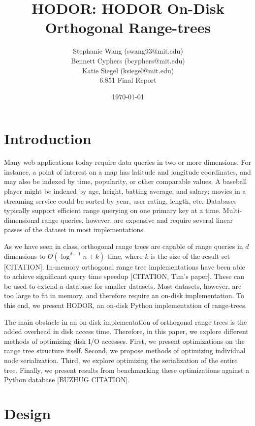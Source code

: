 \documentclass[11pt, oneside]{article}
\title{HODOR: HODOR On-Disk Orthogonal Range-trees}
\author{Stephanie Wang (swang93@mit.edu)\\
Bennett Cyphers (bcyphers@mit.edu)\\
Katie Siegel (ksiegel@mit.edu)\\[2ex]
6.851 Final Report}
\date{\today}
\begin{document}
\maketitle
\clearpage

\section{Introduction}

Many web applications today require data queries in two or more dimensions. For
instance, a point of interest on a map has latitude and longitude coordinates,
and may also be indexed by time, popularity, or other comparable values. A 
baseball player might be indexed by age, height, batting average, and salary;
movies in a streaming service could be sorted by year, user rating, length, etc. 
Databases typically support efficient range querying on one primary key at a
time. Multi-dimensional range queries, however, are expensive and require
several linear passes of the dataset in most implementations. 

As we have seen in class, orthogonal range trees are capable of range queries in
$d$ dimensions to $O(\log^{d-1} n + k)$ time, where $k$ is the size of the
result set [CITATION].  In-memory orthogonal range tree implementations have
been able to achieve significant query time speedup [CITATION, Tim's paper].
These can be used to extend a database for smaller datasets. Most datasets,
however, are too large to fit in memory, and therefore require an on-disk
implementation. To this end, we present HODOR, an on-disk Python implementation
of range-trees. 

The main obstacle in an on-disk implementation of orthogonal range trees is the
added overhead in disk access time. Therefore, in this paper, we explore
different methods of optimizing disk I/O accesses. First, we present
optimizations on the range tree structure itself. Second, we propose methods of
optimizing individual node serialization. Third, we explore optimizing the
serialization of the entire tree. Finally, we present results from benchmarking
these optimizations against a Python database [BUZHUG CITATION]. 


\section{Design}
\end{document}
